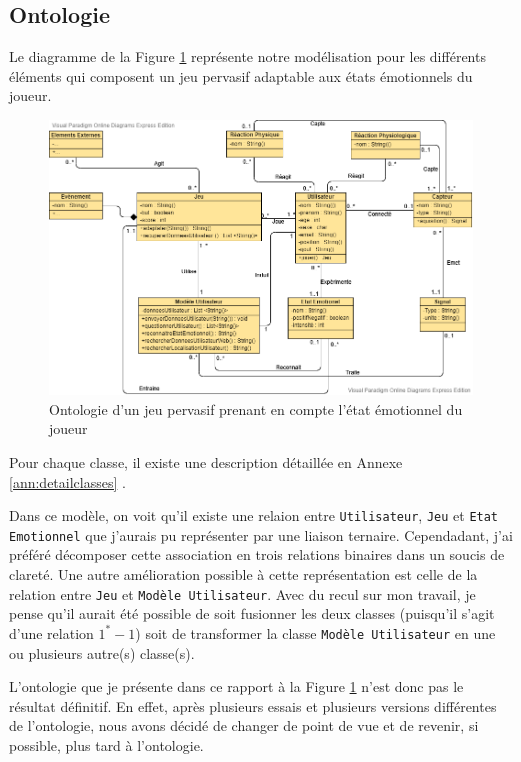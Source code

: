 \documentclass{article}
\begin{document}
	\subsection{Ontologie}\label{sec:ontologie}
		Le diagramme de la Figure \ref{fig:modele} représente notre modélisation pour les différents éléments qui composent un jeu pervasif adaptable aux états émotionnels du joueur. 
		\begin{figure}
			\centering
			\includegraphics[scale=0.5]{../include/ontologie_stage_cnam-v2-5.png}
			\caption{Ontologie d'un jeu pervasif prenant en compte l'état émotionnel du joueur}
			\label{fig:modele}
		\end{figure}
		Pour chaque classe, il existe une description détaillée en Annexe \ref{ann:detailclasses}
		.\par
		Dans ce modèle, on voit qu'il existe une relaion entre \texttt{Utilisateur}, \texttt{Jeu} et \texttt{Etat Emotionnel} que j'aurais pu représenter par une liaison ternaire.
		Cependadant, j'ai préféré décomposer cette association en trois relations binaires dans un soucis de clareté. 
		Une autre amélioration possible à cette représentation est celle de la relation entre \texttt{Jeu} et \texttt{Modèle Utilisateur}. 
		Avec du recul sur mon travail, je pense qu'il aurait été possible de soit fusionner les deux classes (puisqu'il s'agit d'une relation $1^* - 1$) soit de transformer la classe \texttt{Modèle Utilisateur} en une ou plusieurs autre(s) classe(s).\par
		L'ontologie que je présente dans ce rapport à la Figure \ref{fig:modele} n'est donc pas le résultat définitif.
		En effet, après plusieurs essais et plusieurs versions différentes de l'ontologie, nous avons décidé de changer de point de vue et de revenir, si possible, plus tard à l'ontologie.
\end{document}
